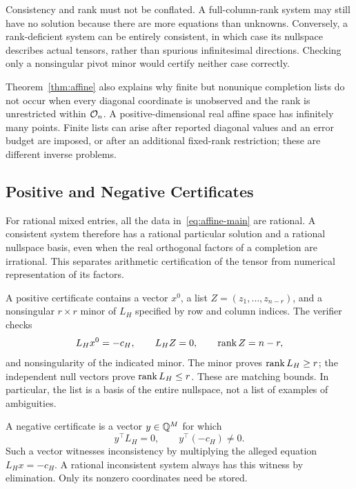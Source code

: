 Consistency and rank must not be conflated. A full-column-rank system may still have no solution because there are more equations than unknowns. Conversely, a rank-deficient system can be entirely consistent, in which case its nullspace describes actual tensors, rather than spurious infinitesimal directions. Checking only a nonsingular pivot minor would certify neither case correctly.

Theorem~\ref{thm:affine} also explains why finite but nonunique completion lists do not occur when every diagonal coordinate is unobserved and the rank is unrestricted within $\mathcal O_n$. A positive-dimensional real affine space has infinitely many points. Finite lists can arise after reported diagonal values and an error budget are imposed, or after an additional fixed-rank restriction; these are different inverse problems.

\subsection{Positive and Negative Certificates}
For rational mixed entries, all the data in~\eqref{eq:affine-main} are rational. A consistent system therefore has a rational particular solution and a rational nullspace basis, even when the real orthogonal factors of a completion are irrational. This separates arithmetic certification of the tensor from numerical representation of its factors.

A positive certificate contains a vector $x^0$, a list $Z=(z_1,\ldots,z_{n-r})$, and a nonsingular $r\times r$ minor of $L_H$ specified by row and column indices. The verifier checks
\begin{equation}\label{eq:positive-cert}
 L_Hx^0=-c_H,\qquad L_HZ=0,\qquad \operatorname{rank} Z=n-r,
\end{equation}
and nonsingularity of the indicated minor. The minor proves $\operatorname{rank} L_H\ge r$; the independent null vectors prove $\operatorname{rank} L_H\le r$. These are matching bounds. In particular, the list is a basis of the entire nullspace, not a list of examples of ambiguities.

A negative certificate is a vector $y\in\mathbb Q^M$ for which
\begin{equation}\label{eq:negative-cert}
 y^\top L_H=0,\qquad y^\top(-c_H)\ne0.
\end{equation}
Such a vector witnesses inconsistency by multiplying the alleged equation $L_Hx=-c_H$. A rational inconsistent system always has this witness by elimination. Only its nonzero coordinates need be stored.

